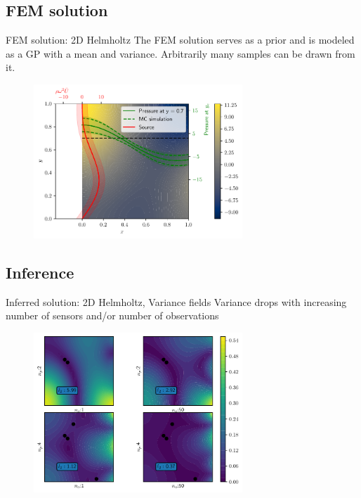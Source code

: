 \documentclass[fleqn,11pt,aspectratio=43]{beamer}
\begin{document}
\subsection{FEM solution}
\begin{frame}{FEM solution: 2D Helmholtz}
The FEM solution serves as a prior and is modeled as a GP with a mean and variance. Arbitrarily many samples can be drawn from it. 
      	\begin{figure}[h]
		\begin{center}
		\includegraphics[width=0.7\textwidth]{2DFEMprior}
		\end{center}
		\end{figure}

\end{frame}

\subsection{Inference}
\begin{frame}{Inferred solution: 2D Helmholtz, Variance fields}
Variance drops with increasing number of sensors and/or number of observations
      	\begin{figure}[h]
		\begin{center}
		\includegraphics[width=0.7\textwidth]{VarField_Posterior}
		\end{center}
		\end{figure}

	\end{frame}
\end{document}
